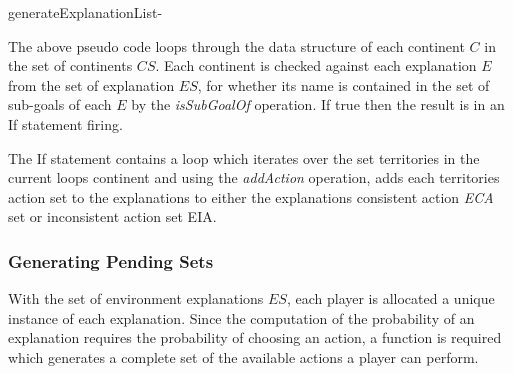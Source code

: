 \documentclass[parskip]{cs4rep}
\begin{document}
\begin{pseudocode}[ruled]{generateExplanationList}{-}
\begin{algorithm}[H]
\end{algorithm}
\end{pseudocode}

The above pseudo code loops through the data structure of each continent $C$ in the set of continents $CS$. Each continent is checked against each explanation $E$ from the set of explanation $ES$, for whether its name is contained in the set of sub-goals of each $E$ by the \textit{isSubGoalOf} operation. If true then the result is in an If statement firing. 

The If statement contains a loop which iterates over the set territories in the current loops continent and using the \textit{addAction} operation, adds each territories action set to the explanations to either the explanations consistent action \textit{ECA} set or inconsistent action set {EIA}.

\subsubsection{Generating Pending Sets}

With the set of environment explanations $ES$, each player is allocated a unique instance of each explanation. Since the computation of the probability of an explanation requires the probability of choosing an action, a function is required which generates a complete set of the available actions a player can perform.
\end{document}

